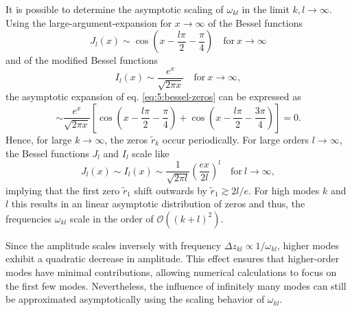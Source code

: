 It is possible to determine the asymptotic scaling of $\omega_{kl}$ in the limit $k,l \rightarrow \infty$.
Using the large-argument-expansion for $x\rightarrow\infty$ of the Bessel functions \cite[eq. 10.17.3]{DLMF}
\begin{equation}
  J_l(x) \sim \cos(x - \frac{l \pi}{2} - \frac{\pi}{4}) \quad \text{for} \ x \rightarrow \infty
\end{equation}
and of the modified Bessel functions \cite[eq. 10.40.1]{DLMF}
\begin{equation}
  I_l(x) \sim \frac{e^x}{\sqrt{2\pi x}} \quad \text{for} \ x \rightarrow \infty,
\end{equation}
the asymptotic expansion of eq. \eqref{eq:5:bessel-zeros} can be expressed as
\begin{equation}
  \sim \frac{e^x}{\sqrt{2\pi x}} \left[\cos(x - \frac{l \pi}{2} - \frac{\pi}{4}) + \cos(x - \frac{l \pi}{2} - \frac{3 \pi}{4})\right] = 0 .
\end{equation}
Hence, for large $k\rightarrow\infty$, the zeros $\tilde{r}_k$ occur periodically.
For large orders $l\rightarrow \infty$, the Bessel functions $J_l$ and $I_l$ scale like \cite[eq. 10.19.1 and eq. 10.41.1]{DLMF}
\begin{equation}
  J_l(x) \sim I_l(x) \sim \frac{1}{\sqrt{2\pi l}} \left(\frac{ex}{2l}\right)^l \quad \text{for} \ l \rightarrow \infty ,
\end{equation}
implying that the first zero $\tilde{r}_1$ shift outwards by $\tilde{r}_1 \gtrsim 2l/e$.
For high modes $k$ and $l$ this results in an linear asymptotic distribution of zeros and thus, the frequencies $\omega_{kl}$ scale in the order of $\mathcal{O}((k + l)^2)$.

Since the amplitude scales inversely with frequency $\Delta z_{kl} \propto 1/\omega_{kl}$, higher modes exhibit a quadratic decrease in amplitude.
This effect ensures that higher-order modes have minimal contributions, allowing numerical calculations to focus on the first few modes.
Nevertheless, the influence of infinitely many modes can still be approximated asymptotically using the scaling behavior of $\omega_{kl}$.